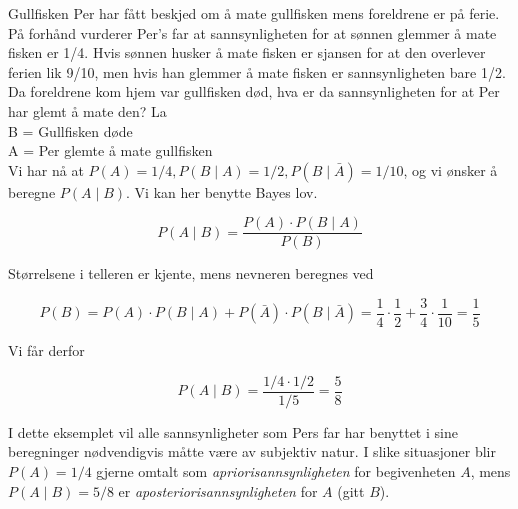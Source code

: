 \begin{eksempel}{Gullfisken}
Per har fått beskjed om å mate gullfisken mens foreldrene er på
ferie. På forhånd vurderer Per's far at sannsynligheten for at
sønnen glemmer å mate fisken er 1/4. Hvis sønnen husker å mate
fisken er sjansen for at den overlever ferien lik 9/10, men hvis
han glemmer å mate fisken er sannsynligheten bare 1/2. Da
foreldrene kom hjem var gullfisken død, hva er da sannsynligheten
for at Per har glemt å mate den? La  \\

\indent      B = Gullfisken døde \\
\indent      A = Per glemte å mate gullfisken \\

\noindent Vi har nå at $P(A)=1/4, P(B\mid A)=1/2, P(B\mid \bar{A} )=1/10$,
og vi ønsker å beregne $P(A\mid B)$. Vi kan her benytte Bayes
lov.

\[ P(A \mid B)=\frac{P(A) \cdot P(B \mid A)}{P(B)} \]

\noindent Størrelsene i telleren er kjente, mens nevneren beregnes ved 

\[    P(B)= P(A) \cdot P(B \mid A)+P(\bar{A}) \cdot P(B \mid \bar{A})=
           \frac{1}{4} \cdot \frac{1}{2}+\frac{3}{4} \cdot \frac{1}{10}=\frac{1}{5} \]

\noindent Vi får derfor

\[    P(A \mid B)=\frac{1/4 \cdot 1/2}{1/5}=\frac{5}{8}   \]

I dette eksemplet vil alle sannsynligheter som Pers far har
benyttet i sine beregninger nødvendigvis måtte være av subjektiv
natur. I slike situasjoner blir $P(A)=1/4$ gjerne omtalt som {\em
apriorisannsynligheten} for begivenheten $A$, mens $P(A\mid
B)=5/8$ er {\em aposteriorisannsynligheten} for $A$ (gitt $B$).
\end{eksempel}

